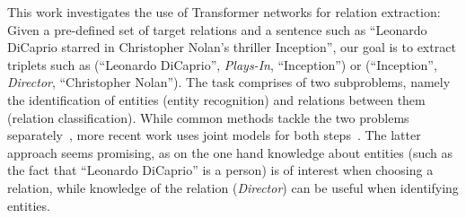 \documentclass{ecai}
\begin{document}
This work investigates the use of Transformer networks for relation extraction: Given a pre-defined set of target relations and a sentence such as ``Leonardo DiCaprio starred in Christopher Nolan's thriller Inception'', our goal is to extract triplets such as (\enquote{Leonardo DiCaprio}, \emph{Plays-In}, \enquote{Inception}) or (\enquote{Inception}, \emph{Director}, \enquote{Christopher Nolan}). The task comprises of two subproblems, namely the identification of entities (entity recognition) and relations between them (relation classification). While common methods tackle the two problems separately~\cite{yadav:2018:survey,zhang:2015:rel_pos,zeng:2014:rel_cnn}, more recent work uses joint models for both steps~\cite{bekoulis:2018:multi_head,luan:2019:span_graphs}. The latter approach seems promising, as on the one hand knowledge about entities (such as the fact that ``Leonardo DiCaprio'' is a person) is of interest when choosing a relation, while knowledge of the relation (\emph{Director}) can be useful when identifying entities.
\end{document}
